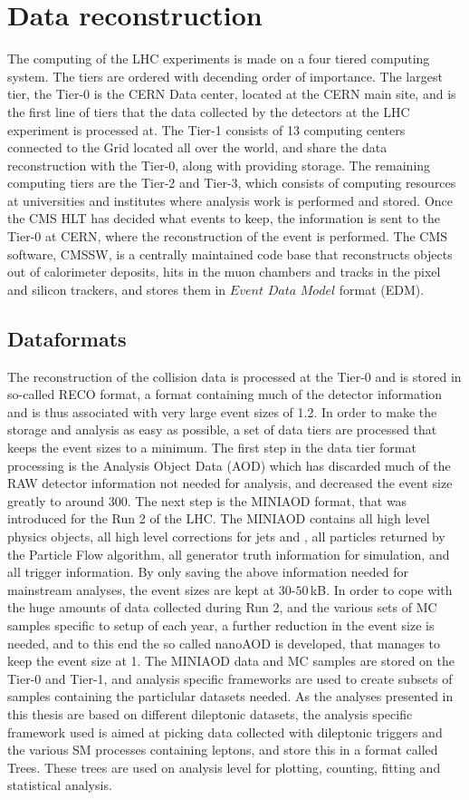\section{Data reconstruction}
\noindent\justify
The computing of the LHC experiments is made on a four tiered computing system. The tiers are ordered with decending order of importance. 
The largest tier, the Tier-0 is the CERN Data center, located at the CERN main site, and is the first line of tiers that the data collected by the detectors at the LHC experiment is processed at. 
The Tier-1 consists of 13 computing centers connected to the Grid located all over the world, and share the data reconstruction with the Tier-0, along with providing storage.
The remaining computing tiers are the Tier-2 and Tier-3, which consists of computing resources at universities and institutes where analysis work is performed and stored. 
Once the CMS HLT has decided what events to keep, the information is sent to the Tier-0 at CERN, where the reconstruction of the event is performed. 
The CMS software, CMSSW, is a centrally maintained code base that reconstructs objects out of calorimeter deposits, hits in the muon chambers and tracks in the pixel and silicon trackers, and stores them in $Event$ $Data$ $Model$ format (EDM).    
\subsection*{Dataformats}
\noindent\justify
The reconstruction of the collision data is processed at the Tier-0 and is stored in so-called RECO format, a format containing much of the detector information and is thus associated with very large event sizes of 1.2\MB.
In order to make the storage and analysis as easy as possible, a set of data tiers are processed that keeps the event sizes to a minimum.
The first step in the data tier format processing is the Analysis Object Data (AOD) which has discarded much of the RAW detector information not needed for analysis, and decreased the event size greatly to around 300\kB.
The next step is the MINIAOD format, that was introduced for the Run 2 of the LHC.
The MINIAOD contains all high level physics objects, all high level corrections for jets and \ptmiss, all particles returned by the Particle Flow algorithm, all generator truth information for simulation, and all trigger information.
By only saving the above information needed for mainstream analyses, the event sizes are kept at $30$-$50\,$kB.
In order to cope with the huge amounts of data collected during Run 2, and the various sets of MC samples specific to setup of each year, a further reduction in the event size is needed, and to this end the so called nanoAOD is developed, that manages to keep the event size at 1\kB.
The MINIAOD data and MC samples are stored on the Tier-0 and Tier-1, and analysis specific frameworks are used to create subsets of samples containing the particlular datasets needed.
As the analyses presented in this thesis are based on different dileptonic datasets, the analysis specific framework used is aimed at picking data collected with dileptonic triggers and the various SM processes containing leptons, and store this in a format called Trees.
These trees are used on analysis level for plotting, counting, fitting and statistical analysis.

